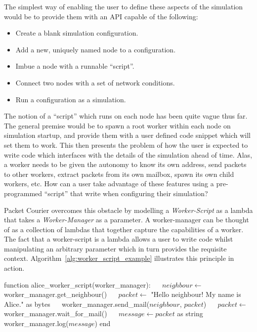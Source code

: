 The simplest way of enabling the user to define these aspects of the simulation would be to provide them with an
API capable of the following:
\begin{itemize}
    \item Create a blank simulation configuration.
    \item Add a new, uniquely named node to a configuration.
    \item Imbue a node with a runnable ``script''.
    \item Connect two nodes with a set of network conditions.
    \item Run a configuration as a simulation.
\end{itemize}

The notion of a ``script'' which runs on each node has been quite vague thus far. The general premise would be to
spawn a root worker within each node on simulation startup, and provide them with a user defined code snippet which
will set them to work. This then presents the problem of how the user is expected to write code which interfaces with
the details of the simulation ahead of time. Alas, a worker needs to be given the autonomy to know its own address,
send packets to other workers, extract packets from its own mailbox, spawn its own child workers, etc. How can a user
take advantage of these features using a pre-programmed ``script'' that write when configuring their simulation?

Packet Courier overcomes this obstacle by modelling a \emph{Worker-Script} as a lambda that takes a
\emph{Worker-Manager} as a parameter. A worker-manager can be thought of as a collection of lambdas that together
capture the capabilities of a worker. The fact that a worker-script is a lambda allows a user to write code whilst
manipulating an arbitrary parameter which in turn provides the requisite context.
Algorithm~\ref{alg:worker_script_example} illustrates this principle in action. \\

\begin{algorithm}[caption={An example of what a worker-script might look like.},label={alg:worker_script_example},
    captionpos=b]
    function alice_worker_script(worker_manager):
    $\quad$ $neighbour \gets$ worker_manager.get_neighbour()
    $\quad$ $packet \gets$ "Hello neighbour! My name is Alice." as bytes
    $\quad$ worker_manager.send_mail($neighbour$, $packet$)
    $\quad$ $packet \gets$ worker_manager.wait_for_mail()
    $\quad$ $message \gets packet$ as string
    $\quad$ worker_manager.log($message$)
    end
\end{algorithm}

